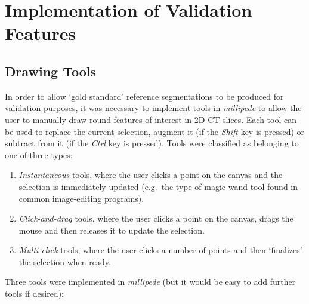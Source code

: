 \chapter{Implementation of Validation Features}
\label{chap:appendixval}

\section{Drawing Tools}

In order to allow `gold standard' reference segmentations to be produced for validation purposes, it was necessary to implement tools in \emph{millipede} to allow the user to manually draw round features of interest in 2D CT slices. Each tool can be used to replace the current selection, augment it (if the \emph{Shift} key is pressed) or subtract from it (if the \emph{Ctrl} key is pressed). Tools were classified as belonging to one of three types:
%
\begin{enumerate}
\item \emph{Instantaneous} tools, where the user clicks a point on the canvas and the selection is immediately updated (e.g.~the type of magic wand tool found in common image-editing programs).
\item \emph{Click-and-drag} tools, where the user clicks a point on the canvas, drags the mouse and then releases it to update the selection.
\item \emph{Multi-click} tools, where the user clicks a number of points and then `finalizes' the selection when ready.
\end{enumerate}

\newpage

\noindent Three tools were implemented in \emph{millipede} (but it would be easy to add further tools if desired):

